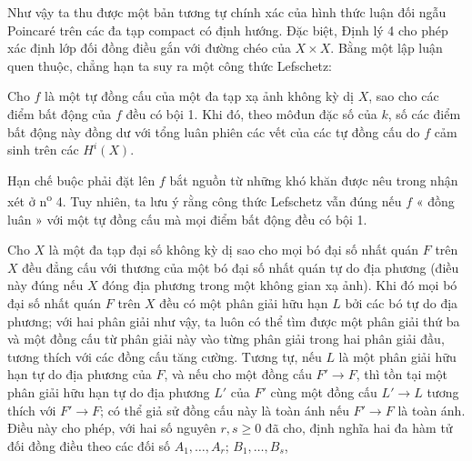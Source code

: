 Như vậy ta thu được một bản tương tự chính xác của hình thức luận đối ngẫu
Poincaré trên các đa tạp compact có định hướng. Đặc biệt, Định lý 4 cho phép xác
định lớp đối đồng điều gắn với đường chéo của $X\times X$. Bằng một lập luận
quen thuộc, chẳng hạn ta suy ra một công thức Lefschetz:

 Cho $f$ là một tự đồng cấu của một đa tạp xạ ảnh không
kỳ dị $X$, sao cho các điểm bất động của $f$ đều có bội 1. Khi đó, theo môđun
đặc số của $k$, số các điểm bất động này đồng dư với tổng luân phiên các vết
của các tự đồng cấu do $f$ cảm sinh trên các $H^{i}(X)$.

Hạn chế buộc phải đặt lên $f$ bắt nguồn từ những khó khăn được nêu trong
nhận xét ở n\textsuperscript{o} 4. Tuy nhiên, ta lưu ý rằng công thức Lefschetz
vẫn đúng nếu $f$ « đồng luân » với một tự đồng cấu mà mọi điểm bất động đều
có bội 1.


Cho $X$ là một đa tạp đại số không kỳ dị sao cho mọi bó đại số nhất quán
$F$ trên $X$ đều đẳng cấu với thương của một bó đại số nhất quán tự do địa
phương (điều này đúng nếu $X$ đóng địa phương trong một không gian xạ ảnh).
Khi đó mọi bó đại số nhất quán $F$ trên $X$ đều có một phân giải hữu hạn
$L$ bởi các bó tự do địa phương; với hai phân giải như vậy, ta luôn có thể
tìm được một phân giải thứ ba và một đồng cấu từ phân giải này vào từng phân
giải trong hai phân giải đầu, tương thích với các đồng cấu tăng cường. Tương
tự, nếu $L$ là một phân giải hữu hạn tự do địa phương của $F$, và nếu cho
một đồng cấu $F'\longrightarrow F$, thì tồn tại một phân giải hữu hạn tự do
địa phương $L'$ của $F'$ cùng một đồng cấu $L'\longrightarrow L$ tương thích
với $F'\longrightarrow F$; có thể giả sử đồng cấu này là toàn ánh nếu
$F'\longrightarrow F$ là toàn ánh. Điều này cho phép, với hai số nguyên
$r,s\geq0$ đã cho, định nghĩa hai đa hàm tử đối đồng điều theo các đối số
$A_1,\ldots,A_r$; $B_1,\ldots,B_s$,

